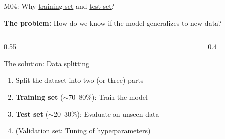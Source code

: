 \documentclass[aspectratio=169, 10pt]{beamer}
\begin{document}
\begin{frame}{M04: Why \href{https://en.wikipedia.org/wiki/Training,_validation,_and_test_data_sets\#Training_data_set}{training set} and \href{https://en.wikipedia.org/wiki/Training,_validation,_and_test_data_sets\#Test_data_set}{test set}?}

    \textbf{The problem:} How do we know if the model generalizes to new data?

    \vspace{2mm}
    \begin{columns}
        \begin{column}{0.55\textwidth}
            \begin{block}{\footnotesize The solution: Data splitting}
                \footnotesize
                \begin{enumerate}
                    \item Split the dataset into two (or three) parts
                    \item \textbf{Training set} ($\sim$70--80\%): Train the model
                    \item \textbf{Test set} ($\sim$20--30\%): Evaluate on unseen data
                    \item (Validation set: Tuning of hyperparameters)
                \end{enumerate}
            \end{block}
        \end{column}

        \begin{column}{0.4\textwidth}
        \end{column}
    \end{columns}


\end{frame}
\end{document}
